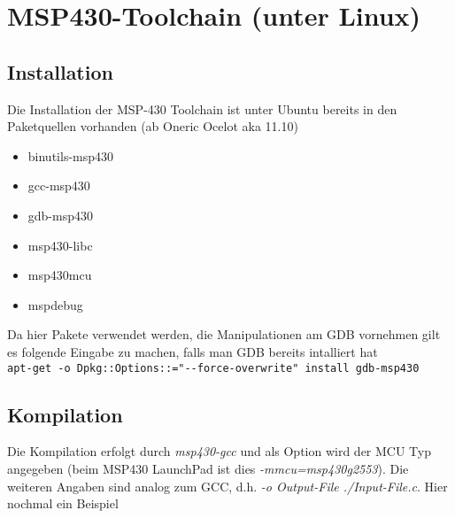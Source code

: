 



\section{MSP430-Toolchain (unter Linux)}
\subsection{Installation}
Die Installation der MSP-430 Toolchain ist unter Ubuntu bereits in den 
Paketquellen vorhanden (ab Oneric Ocelot aka 11.10)

\begin{itemize}
    \item binutils-msp430 
    \item gcc-msp430 
    \item gdb-msp430 
    \item msp430-libc 
    \item msp430mcu 
    \item mspdebug
\end{itemize}

\noindent
Da hier Pakete verwendet werden, die Manipulationen am GDB vornehmen gilt es
folgende Eingabe zu machen, falls man GDB bereits intalliert hat \\

\verb?apt-get -o Dpkg::Options::="--force-overwrite" install gdb-msp430?

\subsection{Kompilation}
Die Kompilation erfolgt durch \emph{msp430-gcc} und als Option wird der MCU Typ
angegeben (beim MSP430 LaunchPad ist dies \emph{-mmcu=msp430g2553}). Die weiteren
Angaben sind analog zum GCC, d.h. \emph{-o Output-File ./Input-File.c}.
Hier nochmal ein Beispiel \\

